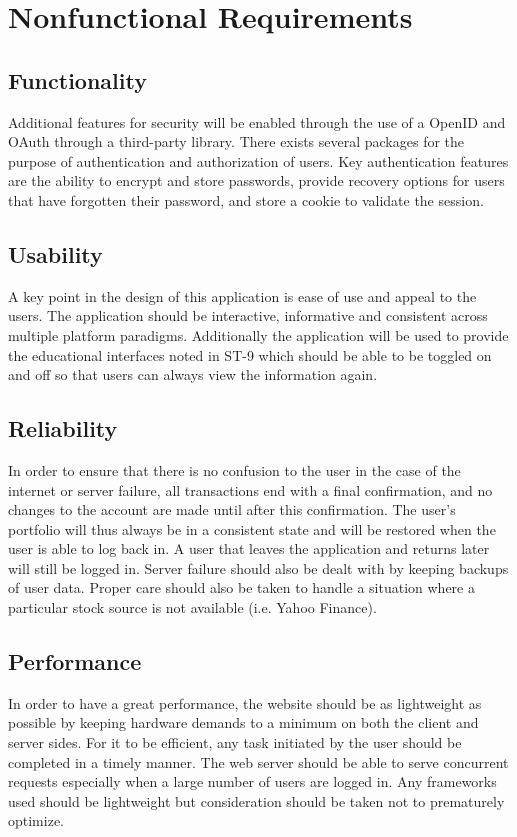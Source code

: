 \section{Nonfunctional Requirements}



\subsection{Functionality}
Additional features for security will be enabled through the use of a
OpenID and OAuth through a third-party library. There exists several packages
for the purpose of authentication and authorization of users. Key authentication
features are the ability to encrypt and store passwords, provide recovery
options for users that have forgotten their password, and store a cookie to
validate the session.


\subsection{Usability}
A key point in the design of this application is ease of use and appeal to the
users. The application should be interactive, informative and consistent across
multiple platform paradigms. Additionally the application will be used to
provide the educational interfaces noted in ST-9 which should be able to be
toggled on and off so that users can always view the information again.


\subsection{Reliability}
In order to ensure that there is no confusion to the user in the case of the
internet or server failure, all transactions end with a final confirmation, and
no changes to the account are made until after this confirmation. The user's
portfolio will thus always be in a consistent state and will be restored when
the user is able to log back in. A user that leaves the application and returns
later will still be logged in. Server failure should also be dealt with by
keeping backups of user data.  Proper care should also be taken to handle a
situation where a particular stock source is not available (i.e. Yahoo Finance).


\subsection{Performance}
In order to have a great performance, the website should be as lightweight as
possible by keeping hardware demands to a minimum on both the client and server
sides. For it to be efficient, any task initiated by the user should be
completed in a timely manner. The web server should be able to serve concurrent
requests especially when a large number of users are logged in. Any frameworks
used should be lightweight but consideration should be taken not to prematurely
optimize.


